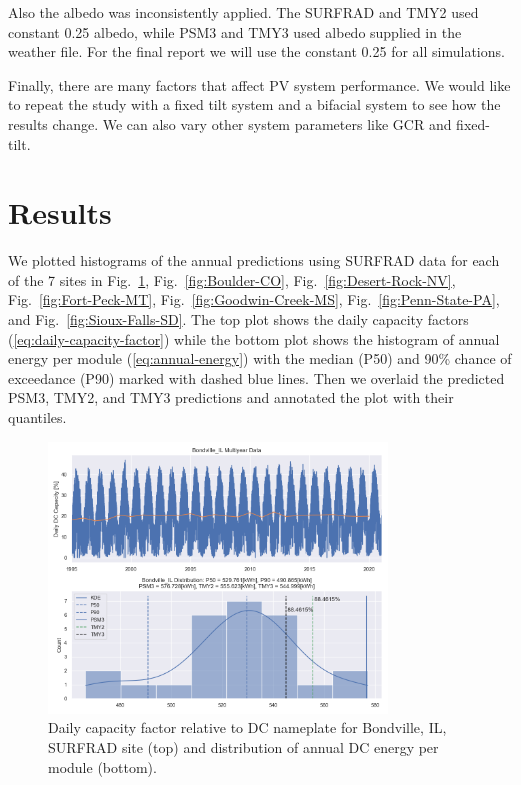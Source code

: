 \documentclass[conference]{IEEEtran}
\begin{document}
Also the albedo was inconsistently applied. The SURFRAD and TMY2 used constant 0.25 albedo, while PSM3 and TMY3 used albedo supplied in the weather file. For the final report we will use the constant 0.25 for all simulations.

Finally, there are many factors that affect PV system performance. We would like to repeat the study with a fixed tilt system and a bifacial system to see how the results change. We can also vary other system parameters like GCR and fixed-tilt.

\section{Results}
We plotted histograms of the annual predictions using SURFRAD data for each of the 7 sites in Fig.~\ref{fig:Bondville-IL}, Fig.~\ref{fig:Boulder-CO}, Fig.~\ref{fig:Desert-Rock-NV}, Fig.~\ref{fig:Fort-Peck-MT}, Fig.~\ref{fig:Goodwin-Creek-MS}, Fig.~\ref{fig:Penn-State-PA}, and Fig.~\ref{fig:Sioux-Falls-SD}. The top plot shows the daily capacity factors (\ref{eq:daily-capacity-factor}) while the bottom plot shows the histogram of annual energy per module (\ref{eq:annual-energy}) with the median (P50) and 90\% chance of exceedance (P90) marked with dashed blue lines. Then we overlaid the predicted PSM3, TMY2, and TMY3 predictions and annotated the plot with their quantiles.

\begin{figure}[htbp]
\centerline{\includegraphics[width=9cm]{Bondville_IL.png}}
\caption{Daily capacity factor relative to DC nameplate for Bondville, IL, SURFRAD site (top) and distribution of annual DC energy per module (bottom).}
\label{fig:Bondville-IL}
\end{figure}
\end{document}
